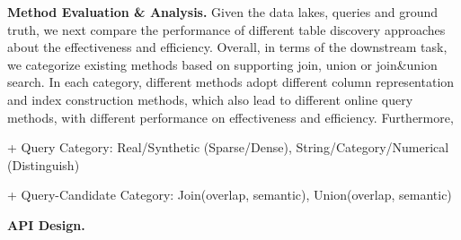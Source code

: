 \noindent\textbf{Method Evaluation \& Analysis.} 
Given the data lakes, queries and ground truth, we next compare the performance of different table discovery approaches about the effectiveness and efficiency. Overall, in terms of the downstream task, we categorize existing methods based on supporting join, union or join\&union search. In each category, different methods adopt different column representation and index construction methods, which also lead to different online query methods, with different performance on effectiveness and efficiency. Furthermore, 

+ Query Category: Real/Synthetic (Sparse/Dense), String/Category/Numerical (Distinguish)

+ Query-Candidate Category: Join(overlap, semantic), Union(overlap, semantic)

\noindent\textbf{API Design.}

